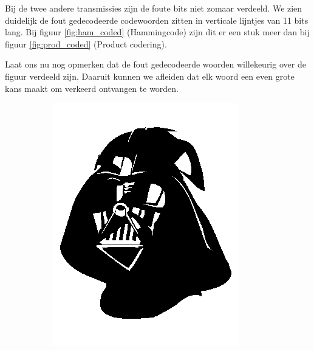 \documentclass[]{article}
\begin{document}
\begin{section}
\begin{subsection}
        Bij de twee andere transmissies zijn de foute bits niet zomaar
        verdeeld. We zien duidelijk de fout gedecodeerde codewoorden
        zitten in verticale lijntjes van 11 bits lang. Bij figuur
        \ref{fig:ham_coded} (Hammingcode) zijn dit er een stuk
        meer dan bij figuur \ref{fig:prod_coded} (Product codering).

        Laat ons nu nog opmerken dat de fout gedecodeerde woorden
        willekeurig over de figuur verdeeld zijn. Daaruit kunnen we
        afleiden dat elk woord een even grote kans maakt om verkeerd
        ontvangen te worden.
        \begin{figure}[h]
            \centering
            \begin{subfigure}{0.24\textwidth}
                \centering
                \includegraphics[width=\textwidth]{darthvader.png}
                \caption{}
                \label{fig:darthvader}
            \end{subfigure}
            \begin{subfigure}{0.24\textwidth}

\end{subfigure}
\end{figure}
\end{subsection}
\end{section}
\end{document}
